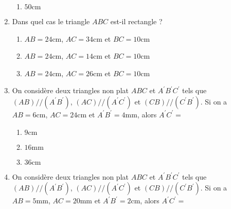 \documentclass[oneside,twoside]{book}
\begin{document}
\begin{enumerate}
\begin{enumerate}
\item\MauvaiseReponse $50\mathrm{cm}$

\end{enumerate}



\item Dans quel cas le triangle $ABC$ est-il rectangle ?

\begin{enumerate}


\item\MauvaiseReponse $AB=24\mathrm{cm}$, $AC=34\mathrm{cm}$ et $BC=10\mathrm{cm}$

\item\MauvaiseReponse $AB=24\mathrm{cm}$, $AC=14\mathrm{cm}$ et $BC=10\mathrm{cm}$

\item\BonneReponse $AB=24\mathrm{cm}$, $AC=26\mathrm{cm}$ et $BC=10\mathrm{cm}$

\end{enumerate}



\item On considère deux triangles non plat $ABC$ et $A^\prime B^\prime C^\prime$ tels que $\left(AB\right)//\left(A^{\prime}B^{\prime}\right)$, $\left(AC\right)//\left(A^{\prime}C^{\prime}\right)$ et $\left(CB\right)//\left(C^{\prime}B^{\prime}\right)$. Si on a $AB=6\mathrm{cm}$, $AC=24\mathrm{cm}$ et $A^{\prime}B^{\prime}=4\mathrm{mm}$, alors $A^{\prime}C^{\prime}=$

\begin{enumerate}


\item\MauvaiseReponse $9\mathrm{cm}$

\item\BonneReponse $16\mathrm{mm}$

\item\MauvaiseReponse $36\mathrm{cm}$

\end{enumerate}



\item On considère deux triangles non plat $ABC$ et $A^\prime B^\prime C^\prime$ tels que $\left(AB\right)//\left(A^{\prime}B^{\prime}\right)$, $\left(AC\right)//\left(A^{\prime}C^{\prime}\right)$ et $\left(CB\right)//\left(C^{\prime}B^{\prime}\right)$. Si on a $AB=5\mathrm{mm}$, $AC=20\mathrm{mm}$ et $A^{\prime}B^{\prime}=2\mathrm{cm}$, alors $A^{\prime}C^{\prime}=$


\end{enumerate}
\end{document}
